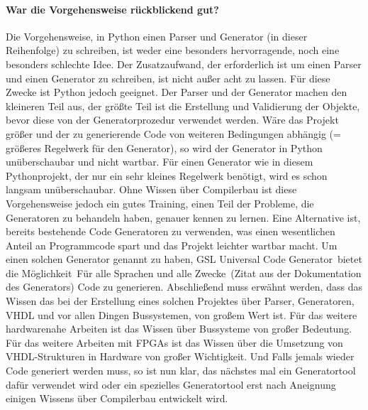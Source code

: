 \documentclass{article}
\newcommand{\nl}{\leavevmode\newline}
\begin{document}
\paragraph{War die Vorgehensweise rückblickend gut?}\nl
Die Vorgehensweise, in Python einen Parser und Generator (in dieser Reihenfolge) zu schreiben, ist weder eine besonders hervorragende, noch eine besonders schlechte Idee. Der Zusatzaufwand, der erforderlich ist um einen Parser und einen Generator zu schreiben, ist nicht außer acht zu lassen. Für diese Zwecke ist Python jedoch geeignet. Der Parser und der Generator machen den kleineren Teil aus, der größte Teil ist die Erstellung und Validierung der Objekte, bevor diese von der Generatorprozedur verwendet werden. Wäre das Projekt größer und der zu generierende Code von weiteren Bedingungen abhängig (= größeres Regelwerk für den Generator), so wird der Generator in Python unüberschaubar und nicht wartbar. Für einen Generator wie in diesem Pythonprojekt, der nur ein sehr kleines Regelwerk benötigt, wird es schon langsam unüberschaubar. Ohne Wissen über Compilerbau ist diese Vorgehensweise jedoch ein gutes Training, einen Teil der Probleme, die Generatoren zu behandeln haben, genauer kennen zu lernen.
Eine Alternative ist, bereits bestehende Code Generatoren zu verwenden, was einen wesentlichen Anteil an Programmcode spart und das Projekt leichter wartbar macht. Um einen solchen Generator genannt zu haben, \glqq GSL Universal Code Generator\grqq\ bietet die Möglichkeit\glqq\ Für alle Sprachen und alle Zwecke\grqq\ (Zitat aus der Dokumentation des Generators) Code zu generieren.
\nl\nl
Abschließend muss erwähnt werden, dass das Wissen das bei der Erstellung eines solchen Projektes über Parser, Generatoren, VHDL und vor allen Dingen Bussystemen, von großem Wert ist. Für das weitere hardwarenahe Arbeiten ist das Wissen über Bussysteme von großer Bedeutung. Für das weitere Arbeiten mit FPGAs ist das Wissen über die Umsetzung von VHDL-Strukturen in Hardware von großer Wichtigkeit. Und Falls jemals wieder Code generiert werden muss, so ist nun klar, das nächstes mal ein Generatortool dafür verwendet wird oder ein spezielles Generatortool erst nach Aneignung einigen Wissens über Compilerbau entwickelt wird.
\end{document}
